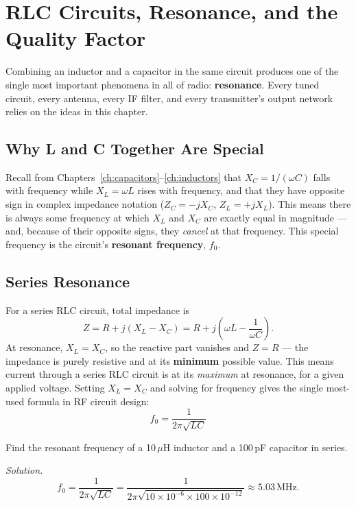 \chapter{RLC Circuits, Resonance, and the Quality Factor}
\label{ch:rlc-resonance}

Combining an inductor and a capacitor in the same circuit produces one of
the single most important phenomena in all of radio: \textbf{resonance}.
Every tuned circuit, every antenna, every IF filter, and every
transmitter's output network relies on the ideas in this chapter.

\section{Why L and C Together Are Special}

Recall from Chapters~\ref{ch:capacitors}--\ref{ch:inductors} that
$X_C = 1/(\omega C)$ falls with frequency while $X_L = \omega L$ rises
with frequency, and that they have opposite sign in complex impedance
notation ($Z_C = -jX_C$, $Z_L = +jX_L$). This means there is always some
frequency at which $X_L$ and $X_C$ are exactly equal in magnitude ---
and, because of their opposite signs, they \emph{cancel} at that
frequency. This special frequency is the circuit's \textbf{resonant
frequency}, $f_0$.

\section{Series Resonance}

For a series RLC circuit, total impedance is
\[
Z = R + j(X_L - X_C) = R + j\left(\omega L - \frac{1}{\omega C}\right).
\]
At resonance, $X_L = X_C$, so the reactive part vanishes and
$Z = R$ --- the impedance is purely resistive and at its \textbf{minimum}
possible value. This means current through a series RLC circuit is at
its \emph{maximum} at resonance, for a given applied voltage. Setting
$X_L = X_C$ and solving for frequency gives the single most-used formula
in RF circuit design:
\[
\boxed{f_0 = \frac{1}{2\pi\sqrt{LC}}}
\]

\begin{examplebox}
Find the resonant frequency of a 10\,$\mu$H inductor and a 100\,pF
capacitor in series.

\emph{Solution.}
\[
f_0 = \frac{1}{2\pi\sqrt{LC}} = \frac{1}{2\pi\sqrt{10\times10^{-6}\times100\times10^{-12}}} \approx 5.03\,\text{MHz}.
\]
\end{examplebox}

